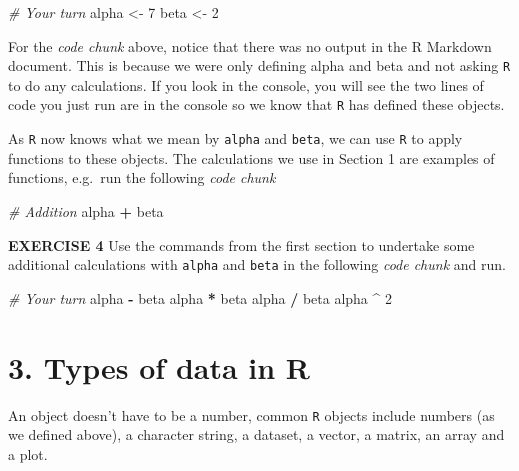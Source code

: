 \documentclass[
]{article}
\newenvironment{Shaded}{\begin{snugshade}}{\end{snugshade}}
\newcommand{\CommentTok}[1]{\textcolor[rgb]{0.56,0.35,0.01}{\textit{#1}}}
\newcommand{\DecValTok}[1]{\textcolor[rgb]{0.00,0.00,0.81}{#1}}
\newcommand{\NormalTok}[1]{#1}
\newcommand{\OperatorTok}[1]{\textcolor[rgb]{0.81,0.36,0.00}{\textbf{#1}}}
\newcommand{\StringTok}[1]{\textcolor[rgb]{0.31,0.60,0.02}{#1}}
\begin{document}
\begin{Shaded}
\begin{Highlighting}[]
\CommentTok{# Your turn}
\NormalTok{alpha <-}\StringTok{ }\DecValTok{7}
\NormalTok{beta <-}\StringTok{ }\DecValTok{2}
\end{Highlighting}
\end{Shaded}

For the \emph{code chunk} above, notice that there was no output in the
R Markdown document. This is because we were only defining alpha and
beta and not asking \texttt{R} to do any calculations. If you look in
the console, you will see the two lines of code you just run are in the
console so we know that \texttt{R} has defined these objects.

As \texttt{R} now knows what we mean by \texttt{alpha} and
\texttt{beta}, we can use \texttt{R} to apply functions to these
objects. The calculations we use in Section 1 are examples of functions,
e.g.~run the following \emph{code chunk}

\begin{Shaded}
\begin{Highlighting}[]
\CommentTok{# Addition}
\NormalTok{alpha }\OperatorTok{+}\StringTok{ }\NormalTok{beta}
\end{Highlighting}
\end{Shaded}

\textbf{EXERCISE 4} Use the commands from the first section to undertake
some additional calculations with \texttt{alpha} and \texttt{beta} in
the following \emph{code chunk} and run.

\begin{Shaded}
\begin{Highlighting}[]
\CommentTok{# Your turn}
\NormalTok{alpha }\OperatorTok{-}\StringTok{ }\NormalTok{beta}
\NormalTok{alpha }\OperatorTok{*}\StringTok{ }\NormalTok{beta}
\NormalTok{alpha }\OperatorTok{/}\StringTok{ }\NormalTok{beta}
\NormalTok{alpha }\OperatorTok{^}\StringTok{ }\DecValTok{2}
\end{Highlighting}
\end{Shaded}

\hypertarget{types-of-data-in-r}{%
\section{3. Types of data in R}\label{types-of-data-in-r}}

An object doesn't have to be a number, common \texttt{R} objects include
numbers (as we defined above), a character string, a dataset, a vector,
a matrix, an array and a plot.
\end{document}
